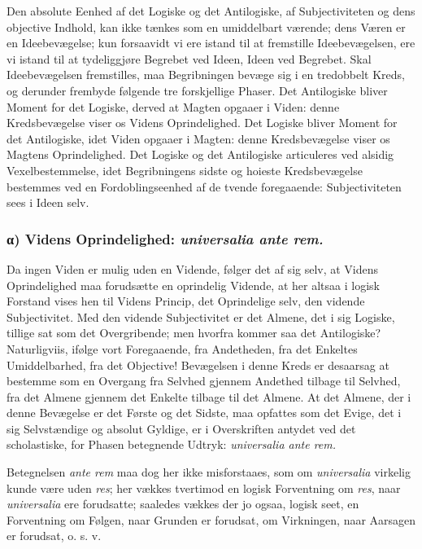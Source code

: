 \documentclass[11pt]{book}
\newcommand{\opage}[1]{\marginnote{\footnotesize\textit{[#1]}}}
\begin{document}
Den absolute Eenhed af det Logiske og det Antilogiske, af
Subjectiviteten og dens objective Indhold, kan ikke tænkes som en
umiddelbart værende; dens Væren er en Ideebevægelse; kun forsaavidt
vi ere istand til at fremstille Ideebevægelsen, ere vi istand til
at tydeliggjøre Begrebet ved Ideen, Ideen ved Begrebet. Skal
Ideebevægelsen fremstilles, maa Begribningen bevæge sig i en
tredobbelt Kreds, og derunder frembyde følgende tre forskjellige
Phaser. Det Antilogiske bliver Moment for det Logiske, derved at
Magten opgaaer i Viden: denne Kredsbevægelse viser os Videns
Oprindelighed. Det Logiske bliver Moment for det Antilogiske, idet
Viden opgaaer i Magten: denne Kredsbevægelse viser os Magtens
Oprindelighed. Det Logiske og det Antilogiske articuleres ved
alsidig Vexelbestemmelse, idet Begribningens sidste og hoieste
Kredsbevægelse bestemmes ved en Fordoblingseenhed af de tvende
foregaaende: Subjectiviteten sees i Ideen selv.

\subsubsection*{α) Videns Oprindelighed: \textit{universalia ante rem.}}

Da ingen Viden er mulig uden en Vidende, følger det af sig selv, at
Videns Oprindelighed maa forudsætte en oprindelig Vidende, at her
altsaa i logisk Forstand vises hen til Videns Princip, det
Oprindelige selv, den vidende Subjectivitet. Med den vidende
Subjectivitet er det Almene, det i sig Logiske, tillige sat som det
Overgribende; men hvorfra kommer saa det Antilogiske?
Naturligviis, ifølge vort Foregaaende, fra Andetheden, fra det
Enkeltes Umiddelbarhed, fra det Objective!
\opage{179} \setcounter{footnote}{0}%
Bevægelsen i denne Kreds er desaarsag at bestemme som en Overgang
fra Selvhed gjennem Andethed tilbage til Selvhed, fra det Almene
gjennem det Enkelte tilbage til det Almene. At det Almene, der i
denne Bevægelse er det Første og det Sidste, maa opfattes som det
Evige, det i sig Selvstændige og absolut Gyldige, er i Overskriften
antydet ved det scholastiske, for Phasen betegnende Udtryk:
\textit{universalia ante rem.}

Betegnelsen \textit{ante rem} maa dog her ikke misforstaaes, som om
\textit{universalia} virkelig kunde være uden \textit{res}; her
vækkes tvertimod en logisk Forventning om \textit{res}, naar
\textit{universalia} ere forudsatte; saaledes vækkes der jo ogsaa,
logisk seet, en Forventning om Følgen, naar Grunden er forudsat, om
Virkningen, naar Aarsagen er forudsat, o. s. v.
\end{document}
